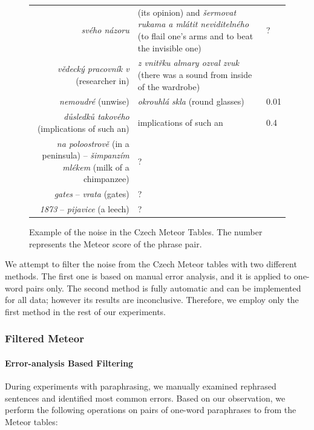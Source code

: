 \begin{figure}[tb]
\begin{center}

	  \begin{tabular}{rll}
  	\textit{svého názoru}  & (its opinion) and \textit{šermovat rukama a mlátit neviditelného} (to flail one's arms and to beat the invisible one) & ?\\
  	\textit{vědecký pracovník v} (researcher in)  & \textit{z vnitřku almary ozval zvuk} (there was a sound from inside of the wardrobe) & \\
    \textit{nemoudré} (unwise) & \textit{okrouhlá skla} (round glasses) & 0.01\\
   	\textit{důsledků takového} (implications of such an) & implications of such an & 0.4\\ 
    \textit{na poloostrově} (in a peninsula) -- \textit{šimpanzím mlékem} (milk of a chimpanzee) & ? \\
    \textit{gates} -- \textit{vrata} (gates)  & ? \\
    \textit{1873} -- \textit{pijavice} (a leech) & ? \\ 
    
   \end{tabular}

\caption{Example of the noise in the Czech Meteor Tables. The number represents the Meteor score of the phrase pair.}
\label{meteor_noise}
\end{center}
\end{figure}

We attempt to filter the noise from the Czech Meteor tables with two different methods. 
The first one is based on manual error analysis, and it is applied to one-word pairs only. 
The second method is fully automatic and can be implemented for all data; however its results are inconclusive. 
Therefore, we employ only the first method in the rest of our experiments.

\subsubsection{Filtered Meteor} 

\paragraph{Error-analysis Based Filtering}
During experiments with paraphrasing, we manually examined rephrased sentences and identified most common errors.
Based on our observation, we perform the following operations on pairs of one-word paraphrases to from the Meteor tables:

